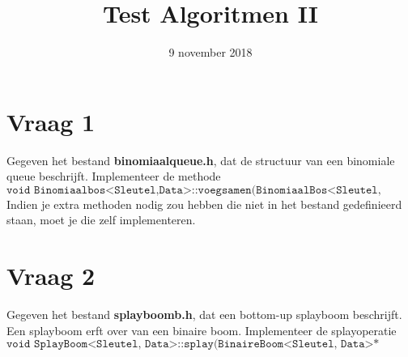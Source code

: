 \documentclass{article}
\begin{document}
\title{Test Algoritmen II}
\date{ 9 november 2018}
\author{}
\maketitle

\section{Vraag 1}
    Gegeven het bestand \textbf{binomiaalqueue.h}, dat de structuur van een binomiale queue beschrijft. Implementeer de methode
    $$\texttt{void Binomiaalbos<Sleutel,Data>::voegsamen(BinomiaalBos<Sleutel, Data>\&\& andere)}$$
    Indien je extra methoden nodig zou hebben die niet in het bestand gedefinieerd staan, moet je die zelf implementeren. 
\section{Vraag 2}
	Gegeven het bestand \textbf{splayboomb.h}, dat een bottom-up splayboom beschrijft. Een splayboom erft over van een binaire boom. Implementeer de splayoperatie
	$$\texttt{void SplayBoom<Sleutel, Data>::splay(BinaireBoom<Sleutel, Data>* plaats)}$$
	
    
\end{document}
